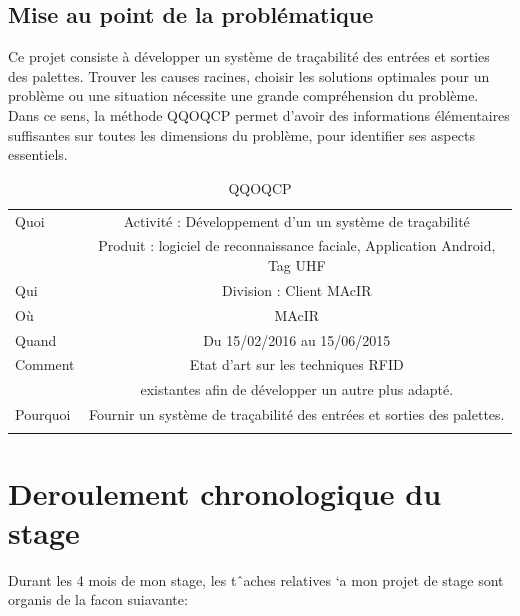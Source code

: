 \documentclass[11pt, a4paper, twoside]{book}
\begin{document}
\subsection{Mise au point de la problématique}
Ce projet consiste à développer un système de traçabilité des entrées et sorties des palettes. Trouver les causes racines, choisir les solutions optimales pour un problème ou une situation nécessite une grande compréhension du problème. Dans ce sens, la méthode QQOQCP permet d'avoir des informations élémentaires suffisantes sur toutes les dimensions du problème, pour identifier ses aspects essentiels.\\


\begin{longtable}{|l|c|}
  \hline
  Quoi & Activité : Développement d’un un système de traçabilité \\
       &  Produit : logiciel de reconnaissance faciale, Application Android, Tag UHF \\
  \hline
  Qui & Division : Client MAcIR\\
  \hline
  Où & MAcIR\\
  \hline
  Quand & Du 15/02/2016 au 15/06/2015\\
  \hline
  Comment & Etat d’art sur les techniques RFID \\
          &  existantes afin de développer un autre plus adapté.\\
  \hline
  Pourquoi & Fournir un système de traçabilité des entrées et sorties des palettes.\\
  \hline
  
\caption{QQOQCP}
\end{longtable}


\section{Deroulement chronologique du stage}
Durant les 4 mois de mon stage, les tˆaches relatives `a mon projet de stage sont organis de la facon suiavante:
\end{document}
